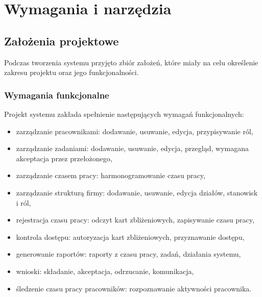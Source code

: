 \chapter{Wymagania i narzędzia}
\label{ch:wymagania-i-narzedzia}


\section{Założenia projektowe}


Podczas tworzenia systemu przyjęto zbiór założeń, które miały na celu określenie zakresu projektu oraz jego funkcjonalności.

\subsection{Wymagania funkcjonalne}

Projekt systemu zakłada spełnienie następujących wymagań funkcjonalnych:


\begin{itemize}
    \item zarządzanie pracownikami: dodawanie, usuwanie, edycja, przypisywanie ról,
    \item zarządzanie zadaniami: dodawanie, usuwanie, edycja, przegląd, wymagana akceptacja przez przełożonego,
    \item zarządzanie czasem pracy: harmonogramowanie czasu pracy,
    \item zarządzanie strukturą firmy: dodawanie, usuwanie, edycja działów, stanowisk i ról,
    \item rejestracja czasu pracy: odczyt kart zbliżeniowych, zapisywanie czasu pracy,
    \item kontrola dostępu: autoryzacja kart zbliżeniowych, przyznawanie dostępu,
    \item generowanie raportów: raporty z czasu pracy, zadań, działania systemu,
    \item wnioski: składanie, akceptacja, odrzucanie, komunikacja,
    \item śledzenie czasu pracy pracowników: rozpoznawanie aktywności pracownika.
\end{itemize}
\newpage
